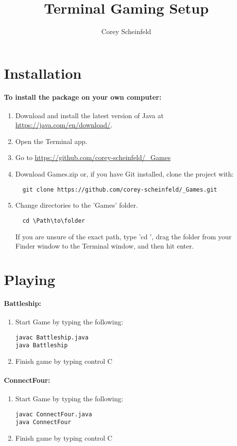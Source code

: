 \documentclass{article}
\title{Terminal Gaming Setup}
\author{Corey Scheinfeld}
\begin{document}
	\maketitle
	\newpage

	\section{Installation}
		\paragraph{To install the package on your own computer:}
			\begin{enumerate}
				\item Download and install the latest version of Java at \url{https://java.com/en/download/}.
				\item Open the Terminal app.
				\item Go to \url{https://github.com/corey-scheinfeld/_Games}
				\item Download Games.zip or, if you have Git installed, clone the project with:
					\begin{lstlisting}
  git clone https://github.com/corey-scheinfeld/_Games.git
					\end{lstlisting}
				\item Change directories to the 'Games' folder. 
					\begin{lstlisting}
  cd \Path\to\folder
					\end{lstlisting}
					If you are unsure of the exact path, type 'cd ', drag the folder from your Finder window to the Terminal window, and then hit enter.
  		\end{enumerate}

\section{Playing}
				\paragraph{Battleship:}
					\begin{enumerate}
								\item Start Game by typing the following:
									\begin{lstlisting}
javac Battleship.java
java Battleship
									\end{lstlisting}
								\item Finish game by typing control C

					\end{enumerate}
				\paragraph{ConnectFour:}
					\begin{enumerate}
								\item Start Game by typing the following:
									\begin{lstlisting}
javac ConnectFour.java
java ConnectFour
									\end{lstlisting}
								\item Finish game by typing control C

					\end{enumerate}
\end{document}
